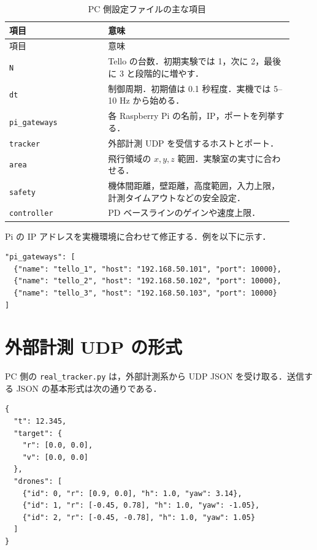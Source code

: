 \begin{longtable}{p{0.32\linewidth}p{0.60\linewidth}}
\caption{PC 側設定ファイルの主な項目}\label{tab:pc_config_items}\\
\toprule
項目 & 意味 \\
\midrule
\endfirsthead
\toprule
項目 & 意味 \\
\midrule
\endhead
\bottomrule
\endfoot
\texttt{N} & Tello の台数．初期実験では 1，次に 2，最後に 3 と段階的に増やす． \\
\texttt{dt} & 制御周期．初期値は 0.1 秒程度．実機では 5--10 Hz から始める． \\
\texttt{pi\_gateways} & 各 Raspberry Pi の名前，IP，ポートを列挙する． \\
\texttt{tracker} & 外部計測 UDP を受信するホストとポート． \\
\texttt{area} & 飛行領域の $x,y,z$ 範囲．実験室の実寸に合わせる． \\
\texttt{safety} & 機体間距離，壁距離，高度範囲，入力上限，計測タイムアウトなどの安全設定． \\
\texttt{controller} & PD ベースラインのゲインや速度上限． \\
\end{longtable}

Pi の IP アドレスを実機環境に合わせて修正する．例を以下に示す．

\begin{lstlisting}
"pi_gateways": [
  {"name": "tello_1", "host": "192.168.50.101", "port": 10000},
  {"name": "tello_2", "host": "192.168.50.102", "port": 10000},
  {"name": "tello_3", "host": "192.168.50.103", "port": 10000}
]
\end{lstlisting}

\section{外部計測 UDP の形式}
\label{sec:tracker_schema}

PC 側の \texttt{real\_tracker.py} は，外部計測系から UDP JSON を受け取る．送信する JSON の基本形式は次の通りである．

\begin{lstlisting}
{
  "t": 12.345,
  "target": {
    "r": [0.0, 0.0],
    "v": [0.0, 0.0]
  },
  "drones": [
    {"id": 0, "r": [0.9, 0.0], "h": 1.0, "yaw": 3.14},
    {"id": 1, "r": [-0.45, 0.78], "h": 1.0, "yaw": -1.05},
    {"id": 2, "r": [-0.45, -0.78], "h": 1.0, "yaw": 1.05}
  ]
}
\end{lstlisting}

